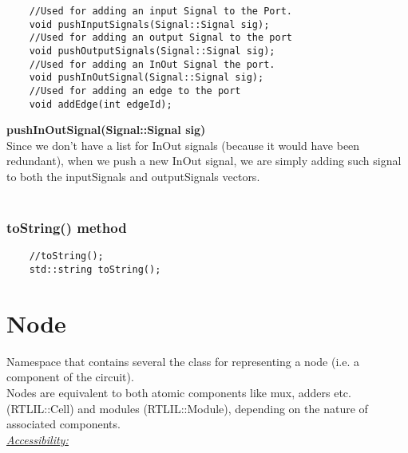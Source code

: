 \documentclass{article}
\newcommand{\sectionbreak}{\clearpage}
\begin{document}
\begin{mdframed}[hidealllines=true, backgroundcolor=magenta!10]
	\begin{lstlisting}
	//Used for adding an input Signal to the Port.
	void pushInputSignals(Signal::Signal sig);
	//Used for adding an output Signal to the port
	void pushOutputSignals(Signal::Signal sig);
	//Used for adding an InOut Signal the port.
	void pushInOutSignal(Signal::Signal sig);
	//Used for adding an edge to the port
	void addEdge(int edgeId);
	\end{lstlisting}
\end{mdframed}

\textbf{pushInOutSignal(Signal::Signal sig)}\\
Since we don't have a list for InOut signals (because it would have been redundant), when we push a new InOut signal, we are simply adding such
signal to both the inputSignals and outputSignals vectors.\\\\

\subsubsection{toString() method}

\begin{mdframed}[hidealllines=true, backgroundcolor=magenta!10]
	\begin{lstlisting}
	//toString();
	std::string toString();
	\end{lstlisting}
\end{mdframed}

\sectionbreak{\clearpage}


\section{Node}

Namespace that contains several the class for representing a node (i.e. a component of the circuit).\\
Nodes are equivalent to both atomic components like mux, adders etc. (RTLIL::Cell)  and modules (RTLIL::Module), depending on the nature of associated 
components.\\

\underline{\textit{\underline{Accessibility: }}}\\
\end{document}
